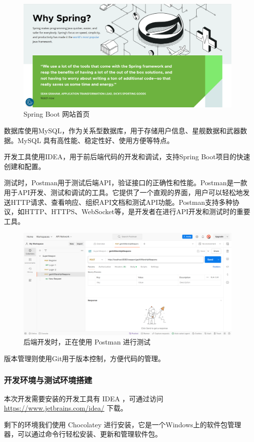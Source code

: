 \documentclass{base}
\begin{document}
\begin{figure}[H]
	\centering
	\includegraphics[width=0.7\linewidth]{images/spring-web.png}
	\caption{Spring Boot 网站首页}
	\label{fig:}
\end{figure}

数据库使用MySQL，作为关系型数据库，用于存储用户信息、星舰数据和武器数据。MySQL 具有高性能、稳定性好、使用方便等特点。

开发工具使用IDEA，用于前后端代码的开发和调试，支持Spring Boot项目的快速创建和配置。

测试时，Postman用于测试后端API，验证接口的正确性和性能。Postman是一款用于API开发、测试和调试的工具。它提供了一个直观的界面，用户可以轻松地发送HTTP请求、查看响应、组织API文档和测试API功能。Postman支持多种协议，如HTTP、HTTPS、WebSocket等，是开发者在进行API开发和测试时的重要工具。

\begin{figure}[H]
	\centering
	\includegraphics[width=0.7\linewidth]{images/postman.png}
	\caption{后端开发时，正在使用 Postman 进行测试}
	\label{fig:}
\end{figure}

版本管理则使用Git用于版本控制，方便代码的管理。

\subsubsection{开发环境与测试环境搭建}

本次开发需要安装的开发工具有 IDEA ，可通过访问 \url{https://www.jetbrains.com/idea/} 下载。

剩下的环境我们使用 Chocolatey 进行安装，它是一个Windows上的软件包管理器，可以通过命令行轻松安装、更新和管理软件包。
\end{document}
